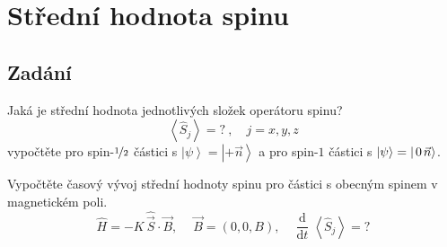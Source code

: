 \documentclass[10pt,a4paper]{article}
\newcommand*{\mask}[2]{%
    \mathord{\makebox[\widthof{\(#1\)}]{\(#2\)}}%
}
\newcommand{\const}[1]{\text{#1}}
\newcommand{\expect}[1]{\left< #1 \right>}
\newcommand{\dd}[2]{\frac{\const{d} #1}{\const{d} #2} \;}
\newcommand{\ket}[1]{\left| #1 \right>}
\newcommand{\vechat}[1]{\hat{\vec{#1}}}
\def\0{\mask{+}{0}}
\begin{document}
\section{Střední hodnota spinu}
\subsection{Zadání}
Jaká je střední hodnota jednotlivých složek operátoru spinu?
\begin{equation*}
    \expect{ \hat S_j } = {?}
    \: , \quad
    j = x, y, z
\end{equation*}
vypočtěte pro spin-$\nicefrac{1}{2}$ částici s $\ket\psi=\ket{+\vec n}$ a pro spin-$1$ částici s $\ket\psi=\ket{\0\vec n}$.

Vypočtěte časový vývoj střední hodnoty spinu pro částici s obecným spinem v magnetickém poli.
\begin{equation*}
    \hat H = - K \, \vechat S \cdot \vec B
    , \: \quad
    \vec B = (0, 0, B)
    , \: \quad
    \dd{}{t} \! \expect{ \hat S_j } = {?}
\end{equation*}
\end{document}
